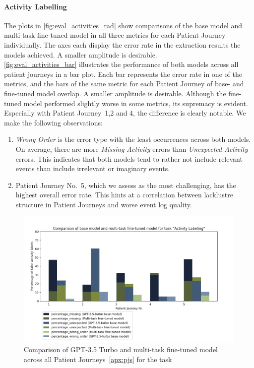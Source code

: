 \paragraph{Activity Labelling} The plots in \autoref{fig:eval_activities_rad} show comparisons of the base model and multi-task fine-tuned model in all three metrics for each Patient Journey individually. The axes each display the error rate in the extraction results the models achieved. A smaller amplitude is desirable.\\
\autoref{fig:eval_activities_bar} illustrates the performance of both models across all patient journeys in a bar plot. Each bar represents the error rate in one of the metrics, and the bars of the same metric for each Patient Journey of base- and fine-tuned model overlap. A smaller amplitude is desirable. Although the fine-tuned model performed slightly worse in some metrics, its supremacy is evident. Especially with Patient Journey~1,2 and 4, the difference is clearly notable. We make the following observations:
\begin{enumerate}
    \item \emph{Wrong Order} is the error type with the least occurrences across both models. On average, there are more \emph{Missing Activity} errors than \emph{Unexpected Activity} errors. This indicates that both models tend to rather not include relevant events than include irrelevant or imaginary events.
    \item Patient Journey No.~5, which we assess as the most challenging, has the highest overall error rate. This hints at a correlation between lacklustre structure in Patient Journeys and worse event log quality.
\end{enumerate}

\begin{figure}[!htb]
    \centering
    \captionsetup{belowskip=0pt,aboveskip=0pt}
    \includegraphics[width=\textwidth]{bachelor_thesis/images/activities_all.png}
    \caption{Comparison of GPT-3.5 Turbo and multi-task fine-tuned model across all Patient Journeys~\ref{apx:pjs} for the task } 
    \label{fig:eval_activities_bar}
\end{figure}

